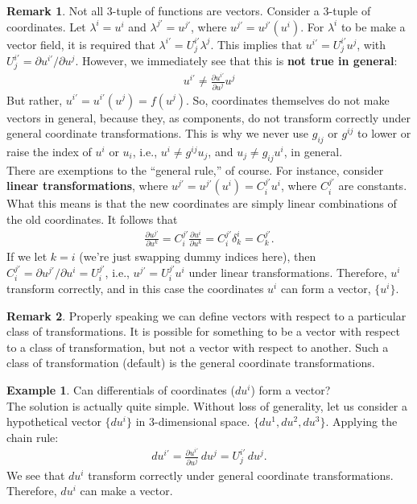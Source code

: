 \documentclass{article}
\theoremstyle{definition}
\newtheorem{rmk}{Remark}[section]
\newtheorem{exmp}{Example}[section]
\begin{document}
\begin{rmk}
	Not all 3-tuple of functions are vectors. Consider a 3-tuple of coordinates. Let $\lambda^i = u^i$ and $\lambda^{j'} = u^{j'}$, where $u^{j'} = u^{j'}(u^i)$. For $\lambda^i$ to be make a vector field, it is required that $\lambda^{i'} = U^{i'}_j\lambda^j$. This implies that $u^{i'} = U^{i'}_ju^j$, with $U^{i'}_j = \partial u^{i'}/\partial u^j$. However, we immediately see that this is \textbf{not true in general}:
	\begin{align*}
	\boxed{u^{i'} \neq \frac{\partial u^{i'}}{\partial u^j}u^j}
	\end{align*}
	But rather, $u^{i'} = u^{i'}(u^j) = f(u^j)$. So, coordinates themselves do not make vectors in general, because they, as components, do not transform correctly under general coordinate transformations. This is why we never use $g_{ij}$ or $g^{ij}$ to lower or raise the index of $u^i$ or $u_i$, i.e., $u^i \neq g^{ij}u_j$, and $u_j \neq g_{ij}u^i$, in general. \\
	
	There are exemptions to the ``general rule,'' of course. For instance, consider \textbf{linear transformations}, where $u^{j'} = u^{j'}(u^i) = C^{j'}_iu^i$, where $C^{j'}_i$ are constants. What this means is that the new coordinates are simply linear combinations of the old coordinates. It follows that
	\begin{align*}
	\frac{\partial u^{j'}}{\partial u^k} = C^{j'}_i\frac{\partial u^i}{\partial u^k} = C^{j'}_i\delta^i_k=C^{j'}_k.
	\end{align*}
	If we let $k=i$ (we're just swapping dummy indices here), then $C^{j'}_i = \partial u^{j'}/\partial u^i = U^{j'}_i$, i.e., $u^{j'} = U^{j'}_iu^i$ under linear transformations. Therefore, $u^i$ transform correctly, and in this case the coordinates $u^i$ can form a vector, $\{u^i\}$.
\end{rmk}
\begin{rmk}
	Properly speaking we can define vectors with respect to a particular class of transformations. It is possible for something to be a vector with respect to a class of transformation, but not a vector with respect to another. Such a class of transformation (default) is the general coordinate transformations. 
\end{rmk}
\begin{exmp}
	Can differentials of coordinates ($du^i$) form a vector?\\
	
	The solution is actually quite simple. Without loss of generality, let us consider a hypothetical vector $\{ du^i \}$ in 3-dimensional space. $\{du^1, du^2, du^3 \}$. Applying the chain rule:
	\begin{align*}
	du^{i'} = \frac{\partial u^{i'}}{\partial u^{j}}\,du^j = U^{i'}_j\,du^j.
	\end{align*}
	We see that $du^i$ transform correctly under general coordinate transformations. Therefore, $du^i$ can make a vector. 
\end{exmp}
\end{document}
